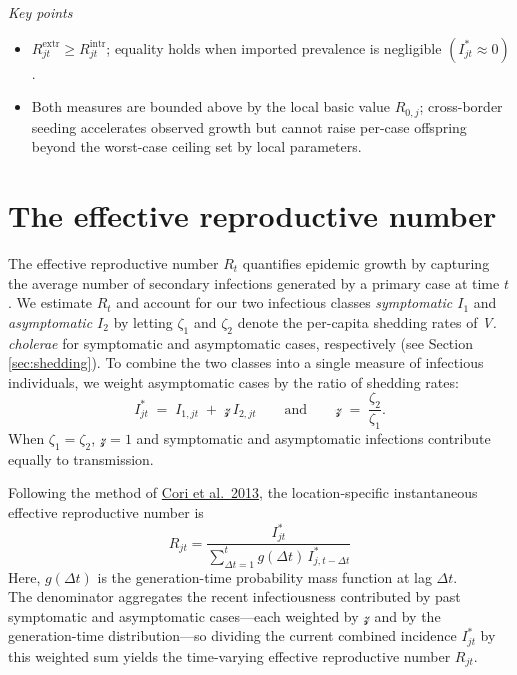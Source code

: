 \documentclass[
]{book}
\providecommand{\tightlist}{%
  \setlength{\itemsep}{0pt}\setlength{\parskip}{0pt}}
\begin{document}
\emph{Key points}

\begin{itemize}
\tightlist
\item
  \(R_{jt}^{\mathrm{extr}} \ge R_{jt}^{\mathrm{intr}}\); equality holds when imported prevalence is negligible \((I^{\ast}_{jt}\approx0)\).
\item
  Both measures are bounded above by the local basic value \(R_{0,j}\); cross-border seeding accelerates observed growth but cannot raise per-case offspring beyond the worst-case ceiling set by local parameters.
\end{itemize}

\section{The effective reproductive number}\label{the-effective-reproductive-number}

The effective reproductive number \(R_t\) quantifies epidemic growth by capturing the average number of secondary infections generated by a primary case at time \(t\). We estimate \(R_t\) and account for our two infectious classes \emph{symptomatic \(I_{1}\)} and \emph{asymptomatic \(I_{2}\)} by
letting \(\zeta_{1}\) and \(\zeta_{2}\) denote the per-capita shedding rates of \emph{V. cholerae} for symptomatic and asymptomatic cases, respectively (see Section \ref{sec:shedding}). To combine the two classes into a single measure of infectious individuals, we weight asymptomatic cases by the ratio of shedding rates:
\begin{equation}
I_{jt}^{\ast} \;=\; I_{1,jt} \;+\; \mathcal{z}\, I_{2,jt}
\qquad \text{and} \qquad
\mathcal{z} \;=\; \frac{\zeta_{2}}{\zeta_{1}}.
\label{eq:I-star}
\end{equation}
When \(\zeta_{1} = \zeta_{2}\), \(\mathcal{z} = 1\) and symptomatic and asymptomatic infections contribute equally to transmission.

Following the method of \href{https://academic.oup.com/aje/article/178/9/1505/89262}{Cori et al.~2013}, the location-specific instantaneous effective reproductive number is
\begin{equation}
R_{jt} = \frac{I_{jt}^{\ast}}{\displaystyle\sum_{\Delta t = 1}^{t} g\left(\Delta t\right)\, I_{j,t-\Delta t}^{\ast}}
\label{eq:R}
\end{equation}
Here, \(g(\Delta t)\) is the generation-time probability mass function at lag \(\Delta t\).\\
The denominator aggregates the recent infectiousness contributed by past symptomatic and asymptomatic cases---each weighted by \(\mathcal{z}\) and by the generation-time distribution---so dividing the current combined incidence \(I_{jt}^{\ast}\) by this weighted sum yields the time-varying effective reproductive number \(R_{jt}\).
\end{document}
